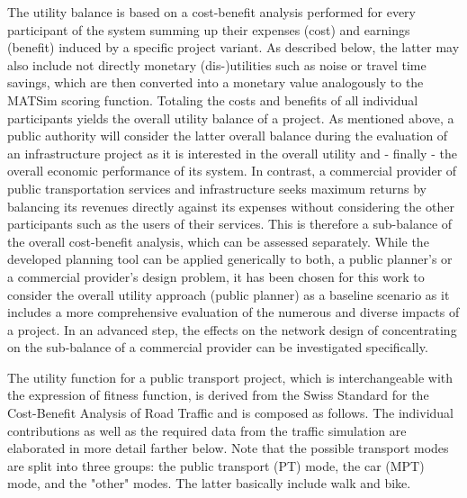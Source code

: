 The utility balance is based on a cost-benefit analysis performed for every participant of the system summing up their expenses (cost) and earnings (benefit) induced by a specific project variant. As described below, the latter may also include not directly monetary (dis-)utilities such as noise or travel time savings, which are then converted into a monetary value analogously to the MATSim scoring function. Totaling the costs and benefits of all individual participants yields the overall utility balance of a project. As mentioned above, a public authority will consider the latter overall balance during the evaluation of an infrastructure project as it is interested in the overall utility and - finally - the overall economic performance of its system. In contrast, a commercial provider of public transportation services and infrastructure seeks maximum returns by balancing its revenues directly against its expenses without considering the other participants such as the users of their services. This is therefore a sub-balance of the overall cost-benefit analysis, which can be assessed separately.
While the developed planning tool can be applied generically to both, a public planner's or a commercial provider's design problem, it has been chosen for this work to consider the overall utility approach (public planner) as a baseline scenario as it includes a more comprehensive evaluation of the numerous and diverse impacts of a project. In an advanced step, the effects on the network design of concentrating on the sub-balance of a commercial provider can be investigated specifically.

The utility function for a public transport project, which is interchangeable with the expression of fitness function, is derived from the Swiss Standard for the Cost-Benefit Analysis of Road Traffic \cite{VSS_Norm_641820_2006Own} and is composed as follows. The individual contributions as well as the required data from the traffic simulation are elaborated in more detail farther below. Note that the possible transport modes are split into three groups: the public transport (PT) mode, the car (MPT) mode, and the "other" modes. The latter basically include walk and bike.

